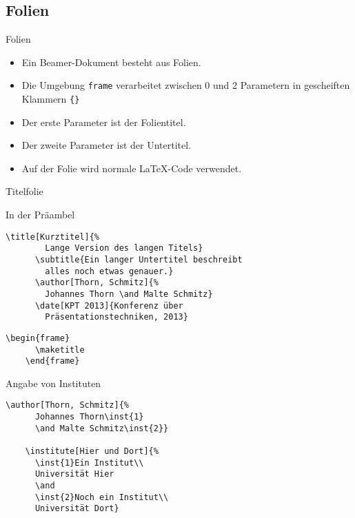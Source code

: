 \subsection{Folien}

\begin{Frame}[fragile]{Folien}
  \begin{itemize}
    \item Ein Beamer-Dokument besteht aus Folien.
    \item Die Umgebung \lstinline-frame- verarbeitet
      zwischen 0 und 2 Parametern in gescheiften Klammern \lstinline-{}-
    \item Der erste Parameter ist der Folientitel.
    \item Der zweite Parameter ist der Untertitel.
    \item Auf der Folie wird normale \LaTeX-Code verwendet.
  \end{itemize}
\end{Frame}

\begin{Frame}[fragile]{Titelfolie}
  \begin{Block}{In der Präambel}
    \begin{lstlisting}[gobble=6,style=block]
      \title[Kurztitel]{%
        Lange Version des langen Titels}
      \subtitle{Ein langer Untertitel beschreibt
        alles noch etwas genauer.}
      \author[Thorn, Schmitz]{%
        Johannes Thorn \and Malte Schmitz}
      \date[KPT 2013]{Konferenz über
        Präsentationstechniken, 2013}
    \end{lstlisting}
  \end{Block}

  \begin{lstlisting}[gobble=4]
    \begin{frame}
      \maketitle
    \end{frame}
  \end{lstlisting}
\end{Frame}

\begin{Frame}[fragile]{Angabe von Instituten}
  \begin{lstlisting}[gobble=4]
    \author[Thorn, Schmitz]{%
      Johannes Thorn\inst{1}
      \and Malte Schmitz\inst{2}}

    \institute[Hier und Dort]{%
      \inst{1}Ein Institut\\
      Universität Hier
      \and
      \inst{2}Noch ein Institut\\
      Universität Dort}
  \end{lstlisting}
\end{Frame}


